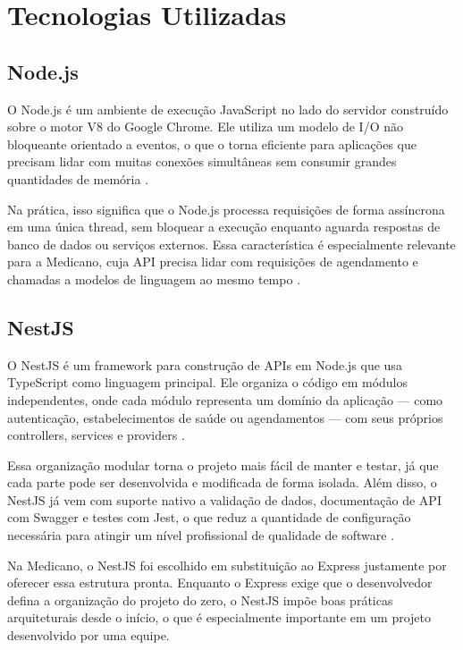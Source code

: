 \section{Tecnologias Utilizadas}
\label{sec:technologies}

\subsection{Node.js}
\label{subsec:nodejs}

O Node.js é um ambiente de execução JavaScript no lado
do servidor construído sobre o motor V8 do Google Chrome.
Ele utiliza um modelo de I/O não bloqueante orientado a
eventos, o que o torna eficiente para aplicações que
precisam lidar com muitas conexões simultâneas sem
consumir grandes quantidades de memória
\cite{tilkov2010}.

Na prática, isso significa que o Node.js processa
requisições de forma assíncrona em uma única thread,
sem bloquear a execução enquanto aguarda respostas de
banco de dados ou serviços externos. Essa característica
é especialmente relevante para a Medicano, cuja API
precisa lidar com requisições de agendamento e chamadas
a modelos de linguagem ao mesmo tempo \cite{tilkov2010}.

\subsection{NestJS}
\label{subsec:nestjs}

O NestJS é um framework para construção de APIs em
Node.js que usa TypeScript como linguagem principal.
Ele organiza o código em módulos independentes, onde
cada módulo representa um domínio da aplicação — como
autenticação, estabelecimentos de saúde ou agendamentos — com seus
próprios controllers, services e providers
\cite{nestjs2024}.

Essa organização modular torna o projeto mais fácil
de manter e testar, já que cada parte pode ser
desenvolvida e modificada de forma isolada. Além disso,
o NestJS já vem com suporte nativo a validação de dados,
documentação de API com Swagger e testes com Jest, o
que reduz a quantidade de configuração necessária para
atingir um nível profissional de qualidade de software
\cite{nestjs2024}.

Na Medicano, o NestJS foi escolhido em substituição ao
Express justamente por oferecer essa estrutura pronta.
Enquanto o Express exige que o desenvolvedor defina
a organização do projeto do zero, o NestJS impõe boas
práticas arquiteturais desde o início, o que é
especialmente importante em um projeto desenvolvido
por uma equipe.

